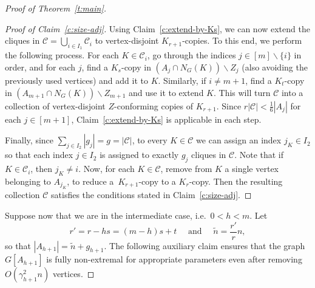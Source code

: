 \documentclass[reqno, 12pt]{amsart}
\numberwithin{equation}{section}
\numberwithin{figure}{section}
\theoremstyle{plain}
\newtheorem{claim}[thm]{Claim}
\theoremstyle{definition}
\def\cC{{\mathcal C}}
\let\setminus=\smallsetminus
\begin{document}
\begin{proof}[Proof of Theorem~\ref{t:main}]
\begin{proof}[Proof of Claim~\ref{c:size-adj}]
        Using Claim~\ref{c:extend-by-Ks}, we can now extend the cliques in $\cC = \bigcup_{i\in I_1}\cC_i$ to vertex-disjoint $K_{r+1}$-copies. To this end, we perform the following process. For each $K\in \cC_i$, go through the indices $j\in [m]\setminus \{i\}$ in order, and for each $j$, find a $K_s$-copy in $(A_j \cap N_G(K))\setminus Z_j$ (also avoiding the previously used vertices) and add it to $K$. Similarly, if $i\neq m+1$, find a $K_t$-copy in $(A_{m+1}\cap N_G(K))\setminus Z_{m+1}$ and use it to extend $K$.  This will turn $\cC$ into a collection of vertex-disjoint $Z$-conforming copies of $K_{r+1}$. Since $r|\cC|< \frac 16|A_j|$ for each $j\in [m+1]$,  Claim~\ref{c:extend-by-Ks} is applicable in each step. %

        
         Finally, since $\sum_{j\in I_2}|g_j|=g=|\cC|$, to every $K\in \cC$ we can assign an index $j_K\in I_2$ so that each index $j\in I_2$ is assigned to exactly $g_j$ cliques in $\cC$. Note that if $K\in\cC_i$, then $j_K\neq i$. Now, for each $K\in \cC$, remove from $K$ a single vertex belonging to $A_{j_K}$, to reduce a~$K_{r+1}$-copy to a $K_r$-copy. Then the resulting collection $\cC$ satisfies the conditions stated in Claim~\ref{c:size-adj}.
    \end{proof}

    Suppose now that we are in the intermediate case, i.e.~$0<h<m$. Let 
    \begin{equation}\label{eq:r'}
        r'=r-hs = (m-h)s+t \quad \text{ and } \quad \tilde{n} = \frac{r'}{r}n,
    \end{equation}
    so that $|A_{h+1}| = \tilde{n}+g_{h+1}$.
    The following auxiliary claim ensures that the graph $G[A_{h+1}]$ is fully non-extremal for appropriate parameters even after removing $O(\gamma_{h+1}^2n)$ vertices. %


\end{proof}
\end{document}
